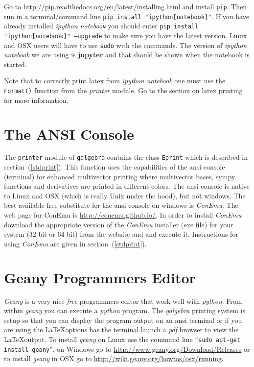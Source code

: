 \documentclass[12pt]{report}
\newcommand{\T}[1]{\texttt{#1}}
\begin{document}
Go to \url{http://pip.readthedocs.org/en/latest/installing.html} and install \T{pip}.  Then run in a terminal/command line
\T{pip install "ipython[notebook]"}.  If you have already installed \emph{ipython notebook} you should enter 
\T{pip install "ipython[notebook]" --upgrade} to make sure you have the latest version.  Linux and OSX users will have to
use \T{sudo} with the commands.  The version of \emph{ipython notebook} we are using is \textbf{jupyter} and that should be
shown when the notebook is started.

Note that to correctly print latex from \emph{ipython notebook} one must use the \T{Format()} function from the \emph{printer}
module.  Go to the section on latex printing for more information.

\section{The ANSI Console}

The \T{printer} module of \T{galgebra} contains the class \T{Eprint} which is described in section~(\ref{stdprint}). This function uses
the capabilities of the ansi console (terminal) for enhanced multivector printing where multivector bases, sympy functions and derivatives
are printed in different colors.  The ansi console is native to Linux and OSX (which is really Unix under the hood), but not windows.
The best available free substitute for
the ansi console on windows is \emph{ConEmu}.  The web page for ConEmu is \url{http://conemu.github.io/}.  In order to install \emph{ConEmu}
download the appropriate version of the \emph{ConEmu} installer (exe file) for your system (32 bit or 64 bit) from the website and and execute it. Instructions for using \emph{ConEmu} are given in section~(\ref{stdprint}).

\section{Geany Programmers Editor}

\emph{Geany} is a very nice \emph{free} programmers editor that work well with \emph{python}.  From within \emph{geany} you can execute a
\emph{python} program.  The \emph{galgebra} printing system is setup so that you can display the program output on an ansi terminal or if
you are using the \LaTeX options has the terminal launch a \emph{pdf} browser to view the \LaTeX output.  To install \emph{geany} on
Linux use the command line ``\T{sudo apt-get install geany}'', on Windows go to \url{http://www.geany.org/Download/Releases} or to install
\emph{geany} in OSX go to \url{http://wiki.geany.org/howtos/osx/running}.
\end{document}
